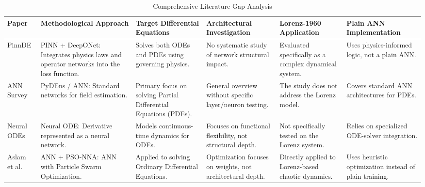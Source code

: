 \begin{table}[!ht] %
    \centering
    \caption{Comprehensive Literature Gap Analysis}
    \label{tab:gap_analysis_updated}
    \tiny %
    \renewcommand{\arraystretch}{1.0} 
    \setlength{\tabcolsep}{2pt} %
    
    \begin{tabularx}{\textwidth}{| 
        >{\hsize=0.6\hsize\raggedright\arraybackslash}X | 
        >{\hsize=1.15\hsize\raggedright\arraybackslash}X | 
        >{\hsize=1.15\hsize\raggedright\arraybackslash}X | 
        >{\hsize=1.05\hsize\raggedright\arraybackslash}X | 
        >{\hsize=1.05\hsize\raggedright\arraybackslash}X | 
        >{\hsize=1.0\hsize\raggedright\arraybackslash}X |
        }
        \hline
        \textbf{Paper} & \textbf{Methodological Approach} & \textbf{Target Differential Equations} & \textbf{Architectural Investigation} & \textbf{Lorenz-1960 Application} & \textbf{Plain ANN Implementation} \\
        \hline
        
        PinnDE \cite{matthews2024pinnde} & PINN + DeepONet: Integrates physics laws and operator networks into the loss function. & Solves both ODEs and PDEs using governing physics. & No systematic study of network structural impact. & Evaluated specifically as a complex dynamical system. & Uses physics-informed logic, not a plain ANN. \\
        \hline
        
        ANN Survey \cite{pratama2022ann} & PyDEns / ANN: Standard networks for field estimation. & Primary focus on solving Partial Differential Equations (PDEs). & General overview without specific layer/neuron testing. & The study does not address the Lorenz model. & Covers standard ANN architectures for PDEs. \\
        \hline
        
        Neural ODEs \cite{chen2018neural} & Neural ODE: Derivative represented as a neural network. & Models continuous-time dynamics for ODEs. & Focuses on functional flexibility, not structural depth. & Not specifically tested on the Lorenz system. & Relies on specialized ODE-solver integration. \\
        \hline
        
        Aslam et al. \cite{aslam2024neuro} & ANN + PSO-NNA: ANN with Particle Swarm Optimization. & Applied to solving Ordinary Differential Equations. & Optimization focuses on weights, not architectural depth. & Directly applied to Lorenz-based chaotic dynamics. & Uses heuristic optimization instead of plain training. \\
        \hline
        

\end{tabularx}
\end{table}
